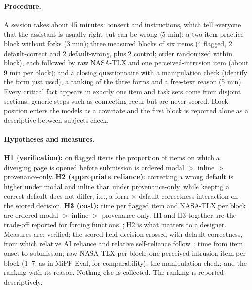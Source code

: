 \documentclass[sigconf,nonacm]{acmart}
\begin{document}
\paragraph{Procedure.}
A session takes about 45 minutes: consent and instructions, which tell
everyone that the assistant is usually right but can be wrong (5 min); a
two-item practice block without forks (3 min); three measured blocks of
six items (4 flagged, 2 default-correct and 2 default-wrong, plus 2
control; order randomized within block), each followed by raw NASA-TLX and
one perceived-intrusion item (about 9 min per block); and a closing
questionnaire with a manipulation check (identify the form just used), a
ranking of the three forms and a free-text reason (5 min). Every critical
fact appears in exactly one item and task sets come from disjoint
sections; generic steps such as connecting recur but are never scored.
Block position enters the models as a covariate and the first block is
reported alone as a descriptive between-subjects check.

\paragraph{Hypotheses and measures.}
\textbf{H1 (verification):} on flagged items the proportion of items on
which a diverging page is opened before submission is ordered modal $>$
inline $>$ provenance-only. \textbf{H2 (appropriate reliance):}
correcting a wrong default is higher under modal and inline than under
provenance-only, while keeping a correct default does not differ, i.e., a
form $\times$ default-correctness interaction on the scored decision.
\textbf{H3 (cost):} time per flagged item and NASA-TLX per block are
ordered modal $>$ inline $>$ provenance-only. H1 and H3 together are the
trade-off reported for forcing functions~\cite{bucinca2021}; H2 is what
matters to a designer. Measures are: verified; the scored-field decision
crossed with default correctness, from which relative AI reliance and
relative self-reliance follow~\cite{schemmer2023}; time from item onset to
submission; raw NASA-TLX per block; one perceived-intrusion item per block
(1--7, as in MiPP-Eval, for comparability); the manipulation check; and
the ranking with its reason. Nothing else is collected. The ranking is
reported descriptively.
\end{document}
